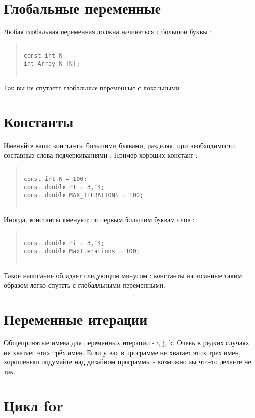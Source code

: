 \section{  Глобальные переменные }

Любая глобальная переменная должна начинаться с большой буквы :
\begin{quote}
\begin{verbatim}
 
const int N;
int Array[N][N];
 
\end{verbatim}
\end{quote}
Так вы не спутаете глобальные переменные с локальными.

\section{  Константы }

Именуйте ваши константы большими буквами, разделяя, при необходимости, составные слова подчеркиваниями :
Пример хороших констант :
\begin{quote}
\begin{verbatim}
 
const int N = 100;
const double PI = 3,14;
const double MAX_ITERATIONS = 100;
 
\end{verbatim}
\end{quote}

Иногда, константы именуют по первым большим буквам слов :
\begin{quote}
\begin{verbatim}
 
const double Pi = 3,14;
const double MaxIterations = 100;
 
\end{verbatim}
\end{quote}
Такое написание обладает следующим минусом : константы написанные таким образом легко спутать с глобалльными переменными.

\section{  Переменные итерации }

Общепринятые имена для переменных итерации - i, j, k. Очень в редких случаях не хватает этих трёх имен. Если у вас в программе не хватает этих трех имен, хорошенько подумайте над дизайном программы - возможно вы что-то делаете не так.

\section{  Цикл for }

